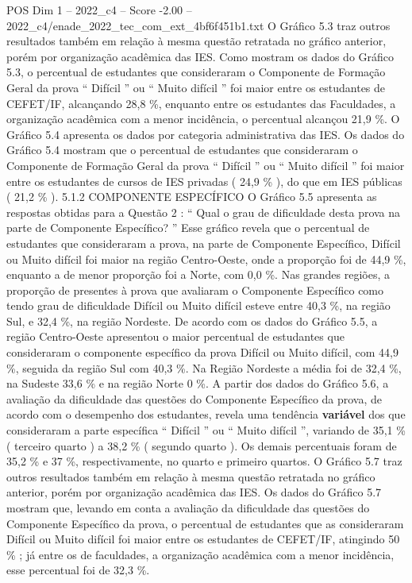 \begin{textsample}{POS Dim 1 – 2022\_c4 – Score -2.00 – 2022\_c4/enade\_2022\_tec\_com\_ext\_4bf6f451b1.txt}
O Gráfico 5.3 traz outros resultados também em relação à mesma questão retratada no gráfico anterior, porém por organização acadêmica das IES.
Como mostram os dados do Gráfico 5.3, o percentual de estudantes que consideraram o Componente de Formação Geral da prova “ Difícil ” ou “ Muito difícil ” foi maior entre os estudantes de CEFET/IF, alcançando 28,8 \%, enquanto entre os estudantes das Faculdades, a organização acadêmica com a menor incidência, o percentual alcançou 21,9 \%.
O Gráfico 5.4 apresenta os dados por categoria administrativa das IES.
Os dados do Gráfico 5.4 mostram que o percentual de estudantes que consideraram o Componente de Formação Geral da prova “ Difícil ” ou “ Muito difícil ” foi maior entre os estudantes de cursos de IES privadas ( 24,9 \% ), do que em IES públicas ( 21,2 \% ). 5.1.2 COMPONENTE ESPECÍFICO O Gráfico 5.5 apresenta as respostas obtidas para a Questão 2 : “ Qual o grau de dificuldade desta prova na parte de Componente Específico? ” Esse gráfico revela que o percentual de estudantes que consideraram a prova, na parte de Componente Específico, Difícil ou Muito difícil foi maior na região Centro-Oeste, onde a proporção foi de 44,9 \%, enquanto a de menor proporção foi a Norte, com 0,0 \%.
Nas grandes regiões, a proporção de presentes à prova que avaliaram o Componente Específico como tendo grau de dificuldade Difícil ou Muito difícil esteve entre 40,3 \%, na região Sul, e 32,4 \%, na região Nordeste.
De acordo com os dados do Gráfico 5.5, a região Centro-Oeste apresentou o maior percentual de estudantes que consideraram o componente específico da prova Difícil ou Muito difícil, com 44,9 \%, seguida da região Sul com 40,3 \%.
Na Região Nordeste a média foi de 32,4 \%, na Sudeste 33,6 \% e na região Norte 0 \%.
A partir dos dados do Gráfico 5.6, a avaliação da dificuldade das questões do Componente Específico da prova, de acordo com o desempenho dos estudantes, revela uma tendência \textbf{variável} dos que consideraram a parte específica “ Difícil ” ou “ Muito difícil ”, variando de 35,1 \% ( terceiro quarto ) a 38,2 \% ( segundo quarto ).
Os demais percentuais foram de 35,2 \% e 37 \%, respectivamente, no quarto e primeiro quartos.
O Gráfico 5.7 traz outros resultados também em relação à mesma questão retratada no gráfico anterior, porém por organização acadêmica das IES.
Os dados do Gráfico 5.7 mostram que, levando em conta a avaliação da dificuldade das questões do Componente Específico da prova, o percentual de estudantes que as consideraram Difícil ou Muito difícil foi maior entre os estudantes de CEFET/IF, atingindo 50 \% ; já entre os de faculdades, a organização acadêmica com a menor incidência, esse percentual foi de 32,3 \%.

\end{textsample}
